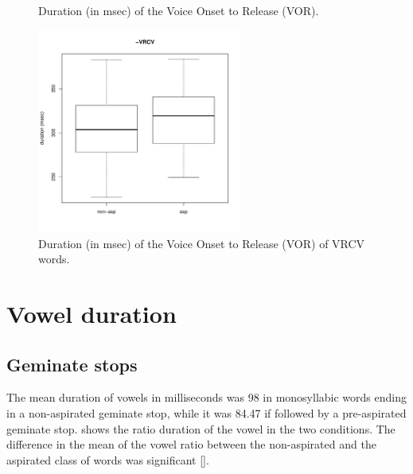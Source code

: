 \documentclass[11pt,a4paper,openany]{memoir}\usepackage[]{graphicx}\usepackage[]{color}
\newenvironment{knitrout}{}{} %
\begin{document}
\begin{figure}
\begin{subfigure}{.5\textwidth}
\begin{knitrout}
\end{knitrout}
\end{subfigure}
\caption{Duration (in msec) of the Voice Onset to Release (VOR).}
\label{f:vor}
\end{figure}

\begin{figure}
\centering
\begin{knitrout}
\color{fgcolor}
\includegraphics[width=0.6\textwidth]{img/di-rho-vor-1} 

\end{knitrout}
\caption{Duration (in msec) of the Voice Onset to Release (VOR) of VRCV words.}
\label{f:vor-rho}
\end{figure}


\section{Vowel duration}
\label{s:vow-dur}

\subsection{Geminate stops}


The mean duration of vowels in milliseconds was 98 in monosyllabic words ending in a non-aspirated geminate stop, while it was 84.47 if followed by a pre-aspirated geminate stop.
 shows the ratio duration of the vowel in the two conditions.
The difference in the mean of the vowel ratio between the non-aspirated and the aspirated class of words was significant [].
\end{document}
